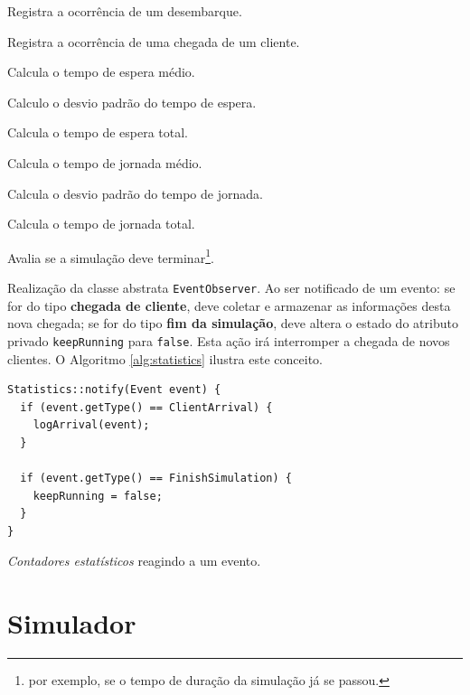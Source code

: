 \begin{description}
    \begin{description}[leftmargin=!,labelwidth=\widthof{\bfseries destinationFloor}]
      \item[\texttt{logDropOff}] Registra a ocorrência de um desembarque.
      \item[\texttt{logTrip}] Registra a ocorrência de uma chegada de um cliente.
      \item[\texttt{getAvgWT}] Calcula o tempo de espera médio.
      \item[\texttt{getDevWt}] Calculo o desvio padrão do tempo de espera.
      \item[\texttt{getTotalWT}] Calcula o tempo de espera total.
      \item[\texttt{getAvgWT}] Calcula o tempo de jornada médio.
      \item[\texttt{getDevWt}] Calcula o desvio padrão do tempo de jornada.
      \item[\texttt{getTotalWT}] Calcula o tempo de jornada total.
      \item[\texttt{keepRunning}] Avalia se a simulação deve terminar\footnote{por exemplo, se o tempo de duração da simulação já se passou.}.
      \item[\texttt{notify}]
        Realização da classe abstrata \texttt{EventObserver}. Ao ser notificado
        de um evento: se for do tipo \textbf{chegada de cliente}, deve coletar e
        armazenar as informações desta nova chegada; se for do tipo \textbf{fim
        da simulação}, deve altera o estado do atributo privado
        \texttt{keepRunning} para \texttt{false}. Esta ação irá interromper a
        chegada de novos clientes. O Algoritmo \ref{alg:statistics} ilustra este
        conceito.
    \end{description}

\begin{algorithm}[htb!]
  \centering
    \begin{verbatim}
Statistics::notify(Event event) {
  if (event.getType() == ClientArrival) {
    logArrival(event);
  }

  if (event.getType() == FinishSimulation) {
    keepRunning = false;
  }
}
    \end{verbatim}
  \caption{\label{alg:statistics}\textit{Contadores estatísticos} reagindo a um evento.}
\end{algorithm}

\end{description}

\section{\label{model:simulador}Simulador}

